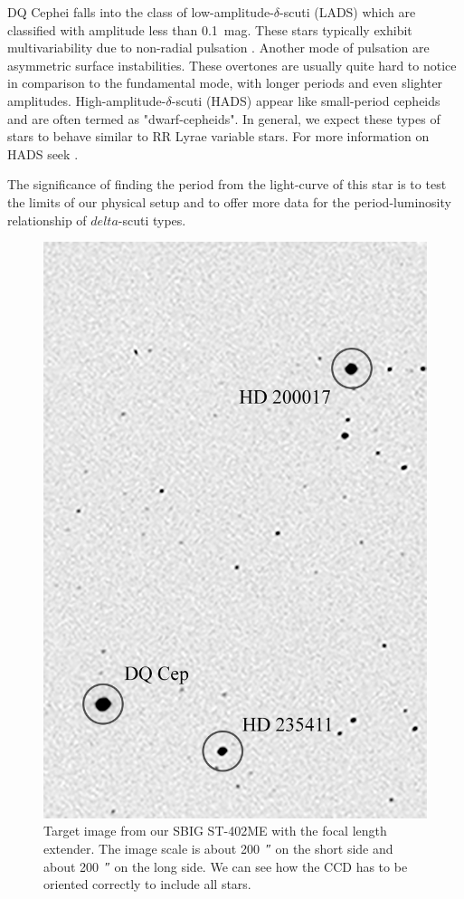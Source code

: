 \documentclass[%
aip,
jmp,
reprint,
floatfix,
nofootinbib
]{revtex4-1}
\begin{document}
	DQ Cephei falls into the class of low-amplitude-$\delta$-scuti (LADS) which are classified with amplitude less than \SI{0.1}{mag}. These stars typically exhibit multivariability due to non-radial pulsation \citep{1937LicOB..18...77F, 1938ApJ....87..133S}. Another mode of pulsation are asymmetric surface instabilities. These overtones are usually quite hard to notice in comparison to the fundamental mode, with longer periods and even slighter amplitudes. High-amplitude-$\delta$-scuti (HADS) appear like small-period cepheids and are often termed as "dwarf-cepheids". In general, we expect these types of stars to behave similar to RR Lyrae variable stars. For more information on HADS seek \citet{1997PASP..109.1221M}. 
	
	The significance of finding the period from the light-curve of this star is to test the limits of our physical setup and to offer more data for the period-luminosity relationship of $delta$-scuti types.
	
	\begin{table}[t]
		\centering
		\label{tab:info}
		
	\end{table}

	\begin{figure}
		\centering
		\includegraphics[width=.8\linewidth]{figs/map.png}
		\caption{Target image from our SBIG ST-402ME with the focal length extender. The image scale is about \SI{200}{\arcsecond} on the short side and about \SI{200}{\arcsecond} on the long side. We can see how the CCD has to be oriented correctly to include all stars.}
		\label{fig:map}
	\end{figure}
	
\end{document}
